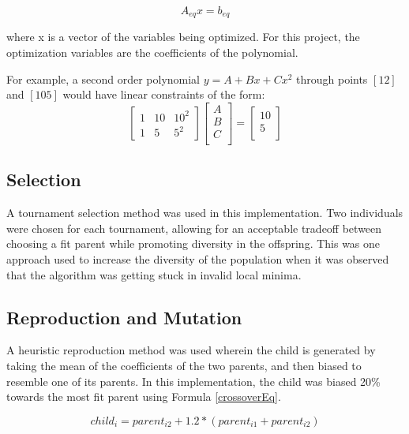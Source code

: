 \begin{equation}
A_{eq}x = b_{eq}
\end{equation}

where x is a vector of the variables being optimized. For this project, the optimization variables are the coefficients of the polynomial.

For example, a second order polynomial $y = A + Bx + Cx^2$ through points $[1 2]$ and $[10 5]$ would have linear constraints of the form:
\begin{equation}
	\begin{bmatrix}
	1 & 10 & 10^2 \\
	1 & 5 & 5^2
	\end{bmatrix}
	\begin{bmatrix}
	A \\
	B \\
	C \\
	\end{bmatrix} =
	\begin{bmatrix}
	10 \\
	5 \\
	\end{bmatrix}
\end{equation}
\subsection{Selection}
A tournament selection method was used in this implementation. Two individuals were chosen for each tournament, allowing for an acceptable tradeoff between choosing a fit parent while promoting diversity in the offspring. This was one approach used to increase the diversity of the population when it was observed that the algorithm was getting stuck in invalid local minima.

\subsection{Reproduction and Mutation}
A heuristic reproduction method was used wherein the child is generated by taking the mean of the coefficients of the two parents, and then biased to resemble one of its parents. In this implementation, the child was biased 20\% towards the most fit parent using Formula \ref{crossoverEq}.

\begin{equation} \label{crossoverEq}
	child_i = parent_{i2} + 1.2 * (parent_{i1} + parent_{i2})
\end{equation}

